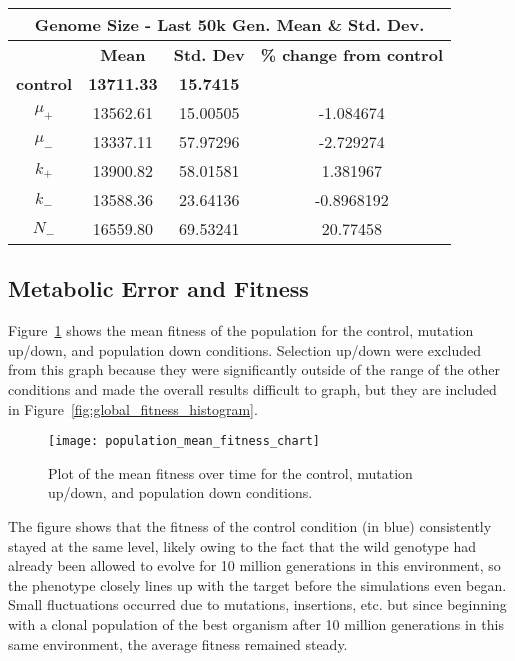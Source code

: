 \begin{table}[H]
	\begin{tabular}{|c|c|c|c|}
		\hline
		\multicolumn{4}{c}{\textbf{Genome Size - Last 50k Gen. Mean \& Std. Dev.}} \\
		\hline
		& \textbf{Mean} & \textbf{Std. Dev} & \textbf{\% change from control} \\
		\hline		
		\textbf{control} & \textbf{13711.33} & \textbf{15.7415} & \textemdash \\ 
		\hline
		$\mu_+$ & 13562.61 & 15.00505 & -1.084674 \\ 
		\hline
		$\mu_-$ & 13337.11 & 57.97296 & -2.729274\\ 
		\hline
		$k_+$ & 13900.82 & 58.01581 & 1.381967 \\ 
		\hline
		$k_-$ & 13588.36 & 23.64136 & -0.8968192 \\ 
		\hline
		$N_-$ & 16559.80 & 69.53241 & 20.77458 \\ 
		\hline
	\end{tabular}
	\label{table:genome_size_stats_last_50k}
\end{table}


\subsection{Metabolic Error and Fitness}
Figure~\ref{fig:mean_fitness_plot} shows the mean fitness of the population for the control, mutation up/down, and population down conditions. Selection up/down were excluded from this graph because they were significantly outside of the range of the other conditions and made the overall results difficult to graph, but they are included in Figure~\ref{fig:global_fitness_histogram}.

\begin{figure}[H]
	\texttt{[image: population\_mean\_fitness\_chart]}
	\caption[Mean fitness]{Plot of the mean fitness over time for the control, mutation up/down, and population down conditions.}
	\label{fig:mean_fitness_plot}
\end{figure}

The figure shows that the fitness of the control condition (in blue) consistently stayed at the same level, likely owing to the fact that the wild genotype had already been allowed to evolve for 10 million generations in this environment, so the phenotype closely lines up with the target before the simulations even began. Small fluctuations occurred due to mutations, insertions, etc. but since beginning with a clonal population of the best organism after 10 million generations in this same environment, the average fitness remained steady. 

